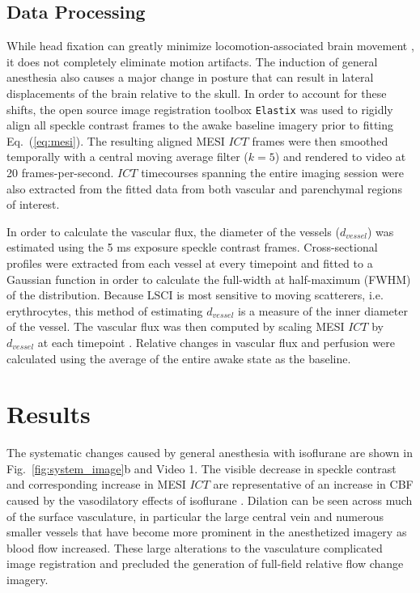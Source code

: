 \documentclass[12pt]{spieman}
\begin{document}
\begin{spacing}{2}

\subsection{Data Processing}

While head fixation can greatly minimize locomotion-associated brain movement \cite{Dombeck:2007gr}, it does not completely eliminate motion artifacts. The induction of general anesthesia also causes a major change in posture that can result in lateral displacements of the brain relative to the skull. In order to account for these shifts, the open source image registration toolbox \texttt{Elastix} \cite{Klein:2010gr} was used to rigidly align all speckle contrast frames to the awake baseline imagery prior to fitting Eq.~(\ref{eq:mesi}). The resulting aligned MESI $ICT$ frames were then smoothed temporally with a central moving average filter ($k=5$) and rendered to video at 20 frames-per-second. $ICT$ timecourses spanning the entire imaging session were also extracted from the fitted data from both vascular and parenchymal regions of interest.

In order to calculate the vascular flux, the diameter of the vessels ($d_{vessel}$) was estimated using the 5 ms exposure speckle contrast frames. Cross-sectional profiles were extracted from each vessel at every timepoint and fitted to a Gaussian function in order to calculate the full-width at half-maximum (FWHM) of the distribution. Because LSCI is most sensitive to moving scatterers, i.e. erythrocytes, this method of estimating $d_{vessel}$ is a measure of the inner diameter of the vessel. The vascular flux was then computed by scaling MESI $ICT$ by $d_{vessel}$ at each timepoint \cite{Kazmi:2015du}. Relative changes in vascular flux and perfusion were calculated using the average of the entire awake state as the baseline.


\section{Results}
\label{sect:results}

The systematic changes caused by general anesthesia with isoflurane are shown in Fig.~\ref{fig:system_image}b and Video 1. The visible decrease in speckle contrast and corresponding increase in MESI $ICT$ are representative of an increase in CBF caused by the vasodilatory effects of isoflurane \cite{Masamoto:2012bj}. Dilation can be seen across much of the surface vasculature, in particular the large central vein and numerous smaller vessels that have become more prominent in the anesthetized imagery as blood flow increased. These large alterations to the vasculature complicated image registration and precluded the generation of full-field relative flow change imagery.


\end{spacing}
\end{document}
